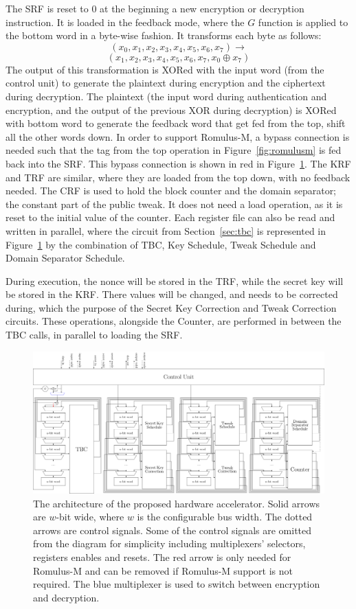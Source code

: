 \documentclass[conference]{IEEEtran}
\begin{document}
The SRF is reset to 0 at the beginning a new encryption or decryption instruction. It is loaded in the feedback mode, where the $G$ function is applied to the bottom word in a byte-wise fashion. It transforms each byte as follows:
\[
(x_0,x_1,x_2,x_3,x_4,x_5,x_6,x_7)\rightarrow
\]
\[
(x_1,x_2,x_3,x_4,x_5,x_6,x_7,x_0\oplus x_7)
\]
%
The output of this transformation is XORed with the input word (from the control unit) to generate the plaintext during encryption and the ciphertext during decryption. The plaintext (the input word during authentication and encryption, and the output of the previous XOR during decryption) is XORed with bottom word to generate the feedback word that get fed from the top, shift all the other words down. In order to support Romulus-M, a bypass connection is needed such that the tag from the top operation in Figure~\ref{fig:romulusm} is fed back into the SRF. This bypass connection is shown in red in Figure~\ref{fig:arch}. The KRF and TRF are similar, where they are loaded from the top down, with no feedback needed. The CRF is used to hold the block counter and the domain separator; the constant part of the public tweak. It does not need a load operation, as it is reset to the initial value of the counter. Each register file can also be read and written in parallel, where the circuit from Section~\ref{sec:tbc} is represented in Figure~\ref{fig:arch} by the combination of TBC, Key Schedule, Tweak Schedule and Domain Separator Schedule.

During execution, the nonce will be stored in the TRF, while the secret key will be stored in the KRF. There values will be changed, and needs to be corrected during, which the purpose of the Secret Key Correction and Tweak Correction circuits. These operations, alongside the Counter, are performed in between the TBC calls, in parallel to loading the SRF.
%
\begin{figure}[!htb]
  \centering
  \includegraphics[width=\textwidth]{arch_diagram.pdf}
  \caption{The architecture of the proposed hardware accelerator. Solid arrows are $w$-bit wide, where $w$ is the configurable bus width. The dotted arrows are control signals. Some of the control signals are omitted from the diagram for simplicity including multiplexers' selectors, registers enables and resets. The red arrow is only needed for Romulus-M and can be removed if Romulus-M support is not required. The blue multiplexer is used to switch between encryption and decryption.}\label{fig:arch}
\end{figure}
\end{document}
